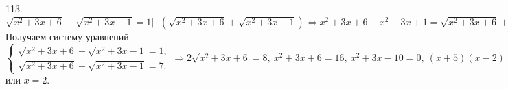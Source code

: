 113. $\sqrt{x^2+3x+6}-\sqrt{x^2+3x-1}=1\Big|\cdot(\sqrt{x^2+3x+6}+\sqrt{x^2+3x-1})\Leftrightarrow x^2+3x+6-x^2-3x+1=\sqrt{x^2+3x+6}+\sqrt{x^2+3x-1}
\Leftrightarrow\sqrt{x^2+3x+6}+\sqrt{x^2+3x-1}=7.$ Получаем систему уравнений $\begin{cases}\sqrt{x^2+3x+6}-\sqrt{x^2+3x-1}=1,\\
\sqrt{x^2+3x+6}+\sqrt{x^2+3x-1}=7.\end{cases}\Rightarrow2\sqrt{x^2+3x+6}=8,\ x^2+3x+6=16,\ x^2+3x-10=0,\ (x+5)(x-2)=0,\ x=-5$ или $x=2.$\\
